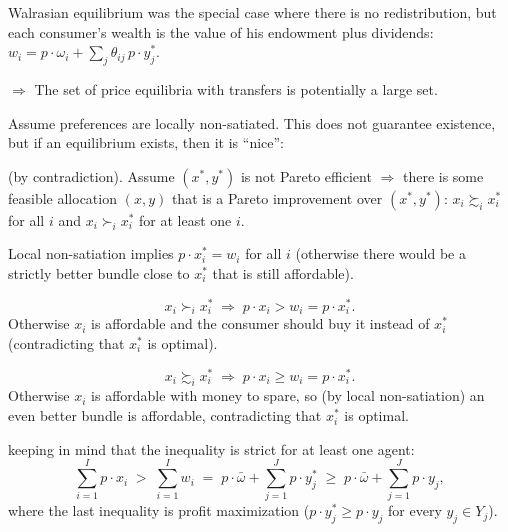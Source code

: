 \documentclass[11pt]{article}
\begin{document}
\begin{flatlist}
  \item Walrasian equilibrium was the special case where there is no redistribution, but each
        consumer's wealth is the value of his endowment plus dividends:
        $w_i=p\cdot\omega_i+\sum_{j}\theta_{ij}\,p\cdot y_j^*$.
  \item $\Rightarrow$ The set of price equilibria with transfers is potentially a large set.
\end{flatlist}

Assume preferences are locally non-satiated. This does not guarantee existence, but if an
equilibrium exists, then it is ``nice'':

\begin{center}
\end{center}

 (by contradiction). Assume $(x^*,y^*)$ is not Pareto efficient
$\Rightarrow$ there is some feasible allocation $(x,y)$ that is a Pareto improvement over
$(x^*,y^*)$: $x_i\succsim_i x_i^*$ for all $i$ and $x_i\succ_i x_i^*$ for at least one $i$.

 Local non-satiation implies $p\cdot x_i^*=w_i$ for all $i$ (otherwise there
would be a strictly better bundle close to $x_i^*$ that is still affordable).

\[ x_i\succ_i x_i^* \;\Longrightarrow\; p\cdot x_i>w_i=p\cdot x_i^* . \]
Otherwise $x_i$ is affordable and the consumer should buy it instead of $x_i^*$
(contradicting that $x_i^*$ is optimal).

\[ x_i\succsim_i x_i^* \;\Longrightarrow\; p\cdot x_i\ge w_i=p\cdot x_i^* . \]
Otherwise $x_i$ is affordable with money to spare, so (by local non-satiation) an even better
bundle is affordable, contradicting that $x_i^*$ is optimal.

 keeping in mind that the inequality is strict for at
least one agent:
\[ \sum_{i=1}^{I}p\cdot x_i\;>\;\sum_{i=1}^{I}w_i
   \;=\;p\cdot\bar\omega+\sum_{j=1}^{J}p\cdot y_j^*
   \;\ge\;p\cdot\bar\omega+\sum_{j=1}^{J}p\cdot y_j , \]
where the last inequality is profit maximization ($p\cdot y_j^*\ge p\cdot y_j$ for every
$y_j\in Y_j$).
\end{document}
